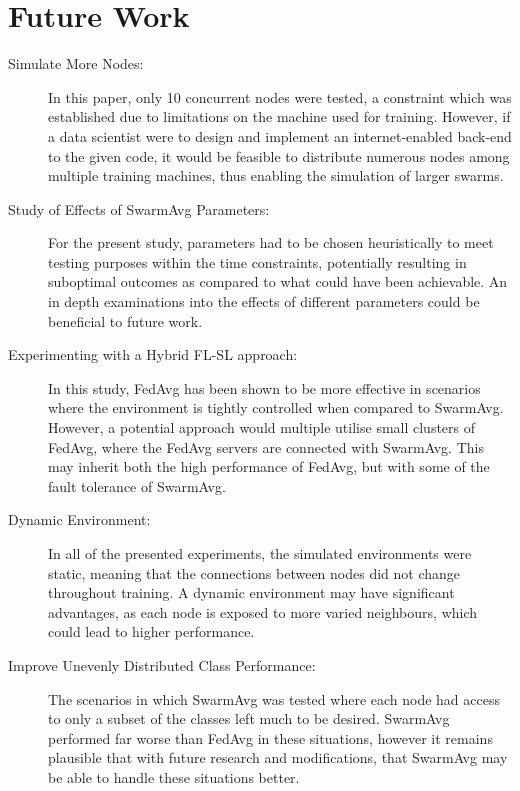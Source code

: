 \section{Future Work}
\begin{description}
	\item[Simulate More Nodes:] In this paper, only 10 concurrent nodes were tested, a constraint which was established due to limitations on the machine used for training. However, if a data scientist were to design and implement an internet-enabled back-end to the given code, it would be feasible to distribute numerous nodes among multiple training machines, thus enabling the simulation of larger swarms.
	\item[Study of Effects of SwarmAvg Parameters: ] For the present study, parameters had to be chosen heuristically to meet testing purposes within the time constraints, potentially resulting in suboptimal outcomes as compared to what could have been achievable. An in depth examinations into the effects of different parameters could be beneficial to future work.
	\item[Experimenting with a Hybrid FL-SL approach: ] In this study, FedAvg has been shown to be more effective in scenarios where the environment is tightly controlled when compared to SwarmAvg. However, a potential approach would multiple utilise small clusters of FedAvg, where the FedAvg servers are connected with SwarmAvg. This may inherit both the high performance of FedAvg, but with some of the fault tolerance of SwarmAvg.
	\item[Dynamic Environment: ] In all of the presented experiments, the simulated environments were static, meaning that the connections between nodes did not change throughout training. A dynamic environment may have significant advantages, as each node is exposed to more varied neighbours, which could lead to higher performance.
	\item[Improve Unevenly Distributed Class Performance: ] The scenarios in which SwarmAvg was tested where each node had access to only a subset of the classes left much to be desired. SwarmAvg performed far worse than FedAvg in these situations, however it remains plausible that with future research and modifications, that SwarmAvg may be able to handle these situations better.
\end{description}